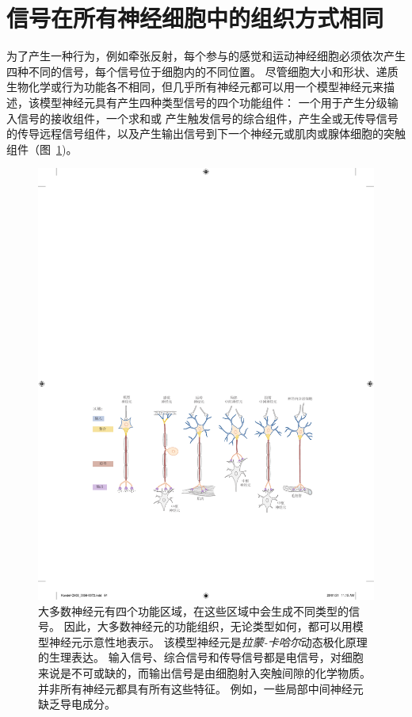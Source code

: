 \section{信号在所有神经细胞中的组织方式相同}
为了产生一种行为，例如牵张反射，每个参与的感觉和运动神经细胞必须依次产生四种不同的信号，每个信号位于细胞内的不同位置。 
尽管细胞大小和形状、递质生物化学或行为功能各不相同，但几乎所有神经元都可以用一个模型神经元来描述，该模型神经元具有产生四种类型信号的四个功能组件：
一个用于产生分级输入信号的接收组件，一个求和或 产生触发信号的综合组件，产生全或无传导信号的传导远程信号组件，以及产生输出信号到下一个神经元或肌肉或腺体细胞的突触组件（图~\ref{fig:3_8})。


\begin{figure}[htbp]
	\centering
	\includegraphics[width=0.95\linewidth]{chap03/fig_3_8}
	\caption{大多数神经元有四个功能区域，在这些区域中会生成不同类型的信号。 
		因此，大多数神经元的功能组织，无论类型如何，都可以用模型神经元示意性地表示。 
		该模型神经元是\textit{拉蒙-卡哈尔}动态极化原理的生理表达。 
		输入信号、综合信号和传导信号都是电信号，对细胞来说是不可或缺的，而输出信号是由细胞射入突触间隙的化学物质。 
		并非所有神经元都具有所有这些特征。 
		例如，一些局部中间神经元缺乏导电成分。}
	\label{fig:3_8}
\end{figure}


